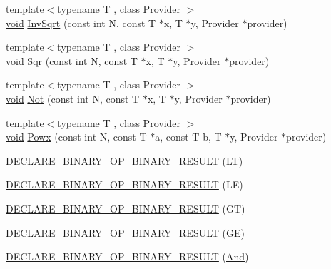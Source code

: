 \begin{DoxyCompactItemize}
\item 
{\footnotesize template$<$typename T , class Provider $>$ }\\\mbox{\hyperlink{mlasi_8h_a88f941d423cb2a819b70a1358982b1a6}{void}} \mbox{\hyperlink{namespaceonnxruntime_1_1math_aafc55a4569db93087c7ad94ab8555b77}{Inv\+Sqrt}} (const int N, const T $\ast$x, T $\ast$y, Provider $\ast$provider)
\item 
{\footnotesize template$<$typename T , class Provider $>$ }\\\mbox{\hyperlink{mlasi_8h_a88f941d423cb2a819b70a1358982b1a6}{void}} \mbox{\hyperlink{namespaceonnxruntime_1_1math_a91dbfd47e8a79e041fbf4fe56738a0d6}{Sqr}} (const int N, const T $\ast$x, T $\ast$y, Provider $\ast$provider)
\item 
{\footnotesize template$<$typename T , class Provider $>$ }\\\mbox{\hyperlink{mlasi_8h_a88f941d423cb2a819b70a1358982b1a6}{void}} \mbox{\hyperlink{namespaceonnxruntime_1_1math_a855745167c5f67a4917f5adf2f252c5d}{Not}} (const int N, const T $\ast$x, T $\ast$y, Provider $\ast$provider)
\item 
{\footnotesize template$<$typename T , class Provider $>$ }\\\mbox{\hyperlink{mlasi_8h_a88f941d423cb2a819b70a1358982b1a6}{void}} \mbox{\hyperlink{namespaceonnxruntime_1_1math_a818db5fb0354360ec0fc716f810543b9}{Powx}} (const int N, const T $\ast$a, const T b, T $\ast$y, Provider $\ast$provider)
\item 
\mbox{\hyperlink{namespaceonnxruntime_1_1math_a7bb2b93dae6a441dcdac632655a2244f}{D\+E\+C\+L\+A\+R\+E\+\_\+\+B\+I\+N\+A\+R\+Y\+\_\+\+O\+P\+\_\+\+B\+I\+N\+A\+R\+Y\+\_\+\+R\+E\+S\+U\+LT}} (LT)
\item 
\mbox{\hyperlink{namespaceonnxruntime_1_1math_a9f7a049b4e19a9695b35f0b574860e24}{D\+E\+C\+L\+A\+R\+E\+\_\+\+B\+I\+N\+A\+R\+Y\+\_\+\+O\+P\+\_\+\+B\+I\+N\+A\+R\+Y\+\_\+\+R\+E\+S\+U\+LT}} (LE)
\item 
\mbox{\hyperlink{namespaceonnxruntime_1_1math_ab49b1b8fa78b100281285fcc891f439e}{D\+E\+C\+L\+A\+R\+E\+\_\+\+B\+I\+N\+A\+R\+Y\+\_\+\+O\+P\+\_\+\+B\+I\+N\+A\+R\+Y\+\_\+\+R\+E\+S\+U\+LT}} (GT)
\item 
\mbox{\hyperlink{namespaceonnxruntime_1_1math_a835de68d90ac52cc6e1a4e3c347143f3}{D\+E\+C\+L\+A\+R\+E\+\_\+\+B\+I\+N\+A\+R\+Y\+\_\+\+O\+P\+\_\+\+B\+I\+N\+A\+R\+Y\+\_\+\+R\+E\+S\+U\+LT}} (GE)
\item 
\mbox{\hyperlink{namespaceonnxruntime_1_1math_a606495a2dc67a80a8716b0d10a0b057b}{D\+E\+C\+L\+A\+R\+E\+\_\+\+B\+I\+N\+A\+R\+Y\+\_\+\+O\+P\+\_\+\+B\+I\+N\+A\+R\+Y\+\_\+\+R\+E\+S\+U\+LT}} (\mbox{\hyperlink{classonnxruntime_1_1And}{And}})

\end{DoxyCompactItemize}
